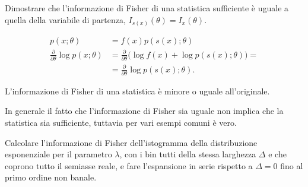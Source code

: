 \begin{exercise}
    Dimostrare che l'informazione di Fisher di una statistica sufficiente è
    uguale a quella della variabile di partenza, $I_{s(x)}(\theta) =
    I_x(\theta)$.
\end{exercise}

\begin{solution}
    \begin{align*}
    	p(x;\theta)
    	&= f(x)p(s(x);\theta) \\
    	\frac{\partial}{\partial\theta}\log p(x;\theta)
    	&= \frac{\partial}{\partial\theta} \big( \log f(x) + \log p(s(x);\theta) \big) = \\
    	&= \frac{\partial}{\partial\theta}\log p(s(x);\theta).
    \end{align*}
\end{solution}

\begin{fact}
	\label{th:fishstat}
	L'informazione di Fisher di una statistica è minore o uguale all'originale.
\end{fact}

\noindent In generale il fatto che l'informazione di Fisher sia uguale non implica che la statistica sia sufficiente, tuttavia per vari esempi comuni è vero.

\begin{exercise}
    Calcolare l'informazione di Fisher dell'istogramma della distribuzione
    esponenziale per il parametro $\lambda$, con i bin tutti della stessa
    larghezza $\Delta$ e che coprono tutto il semiasse reale, e fare
    l'espansione in serie rispetto a $\Delta = 0$ fino al primo ordine non
    banale.
\end{exercise}

